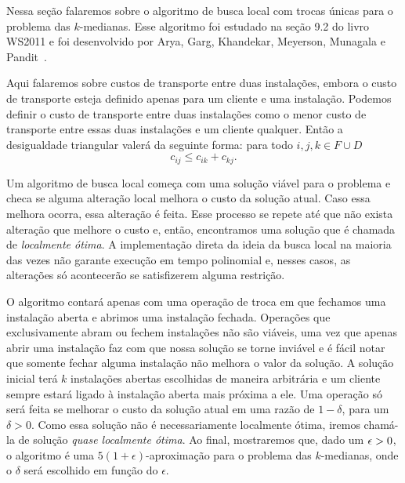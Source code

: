 Nessa seção falaremos sobre o algoritmo de busca local com trocas únicas para o problema das $k$-medianas. Esse algoritmo foi estudado na seção 9.2 do livro WS2011 e foi desenvolvido por Arya, Garg, Khandekar, Meyerson, Munagala e Pandit~\cite{AryaLocal}.

Aqui falaremos sobre custos de transporte entre duas instalações, embora o custo de transporte esteja definido apenas para um cliente e uma instalação.
Podemos definir o custo de transporte entre duas instalações como o menor custo de transporte entre essas duas instalações e um cliente qualquer. Então a desigualdade triangular valerá da seguinte forma: para todo $i,j,k \in F \cup D$ 
\[ c_{ij} \leq c_{ik} + c_{kj}.\]

Um algoritmo de busca local começa com uma solução viável para o problema e checa se alguma alteração local melhora o custo da solução atual. Caso essa melhora ocorra, essa alteração é feita. Esse processo se repete até que não exista alteração que melhore o custo e, então, encontramos uma solução que é chamada de \emph{localmente ótima}. A implementação direta da ideia da busca local na maioria das vezes não garante execução em tempo polinomial e, nesses casos, as alterações só acontecerão se satisfizerem alguma restrição. 

O algoritmo contará apenas com uma operação de troca em que fechamos uma instalação aberta e abrimos uma instalação fechada. Operações que exclusivamente abram ou fechem instalações não são viáveis, uma vez que apenas abrir uma instalação faz com que nossa solução se torne inviável e é fácil notar que somente fechar alguma instalação não melhora o valor da solução. A solução inicial terá  $k$ instalações abertas escolhidas de maneira arbitrária e um cliente sempre estará ligado à instalação aberta mais próxima a ele. Uma operação só será feita se melhorar o custo da solução atual em uma razão de $1-\delta$, para um $\delta>0$. Como essa solução não é necessariamente localmente ótima, iremos chamá-la de solução \emph{quase localmente ótima}. Ao final, mostraremos que, dado um $\epsilon > 0$, o algoritmo é uma $5(1 + \epsilon)$-aproximação para o problema das $k$-medianas, onde o $\delta$ será escolhido em função do $\epsilon$.

